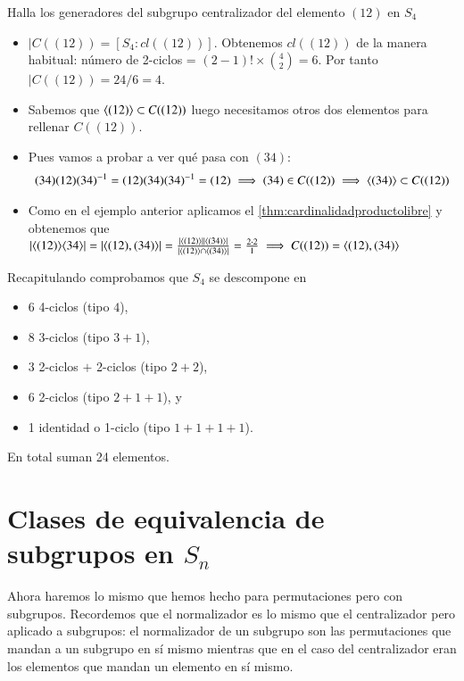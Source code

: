\begin{ej}
	Halla los generadores del subgrupo centralizador del elemento $(12)$ en $S_4$
	
	\begin{itemize}
		\item $|C((12)) = [S_4:cl((12))]$. Obtenemos $cl((12))$ de la manera habitual: número de 2-ciclos = $(2-1)! \times \binom{4}{2} = 6$. Por tanto $|C((12)) = 24/6 = 4$.
		
		\item Sabemos que $\langle(12)\rangle \subset C((12))$ luego necesitamos otros dos elementos para rellenar $C((12))$.
		\item Pues vamos a probar a ver qué pasa con $(34)$:
		\begin{align*}
			(34)(12)(34)^{-1} = (12)(34)(34)^{-1} = (12) \implies (34) \in C((12)) \implies \langle(34)\rangle \subset C((12))
		\end{align*}
		\item Como en el ejemplo anterior aplicamos el \autoref{thm:cardinalidadproductolibre} y obtenemos que $|\langle(12)\rangle\langle34\rangle| = |\langle(12), (34)\rangle| = \frac{|\langle(12)\rangle||\langle(34)\rangle|}{|\langle(12)\rangle \cap \langle(34)\rangle|} = \frac{2\cdot2}{1} \implies C((12)) = \langle(12), (34)\rangle$
	\end{itemize}
\end{ej}

Recapitulando comprobamos que $S_4$ se descompone en
\begin{itemize}
	\item 6 4-ciclos (tipo $4$),
	\item 8 3-ciclos (tipo $3+1$),
	\item 3 2-ciclos $+$ 2-ciclos (tipo $2+2$),
	\item 6 2-ciclos (tipo $2+1+1$), y
	\item 1 identidad o 1-ciclo (tipo $1+1+1+1$).
\end{itemize}
En total suman 24 elementos.

\section{Clases de equivalencia de subgrupos en $S_n$}

Ahora haremos lo mismo que hemos hecho para permutaciones pero con subgrupos. Recordemos que el normalizador es lo mismo que el centralizador pero aplicado a subgrupos: el normalizador de un subgrupo son las permutaciones que mandan a un subgrupo en sí mismo mientras que en el caso del centralizador eran los elementos que mandan un elemento en sí mismo.

